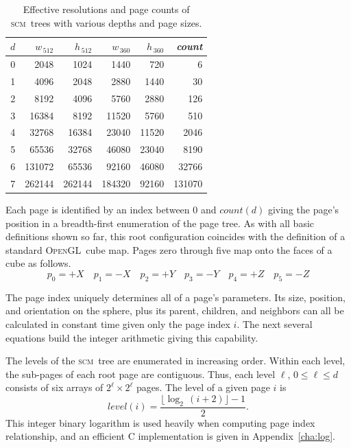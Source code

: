 \documentclass[oneside,10pt]{memoir}
\newcommand{\opengl}  {\textsc{OpenGL}}
\newcommand{\scm}     {\textsc{scm}}
\newcommand{\B}{\bigstrut[b]}
\newcommand{\T}{\bigstrut[t]}
\newcommand{\scmcount} [1]{\ensuremath{\mathit{count}(#1)}}
\newcommand{\scmlevel} [1]{\ensuremath{\mathit{level}(#1)}}
\begin{document}
\begin{Spacing}{1.1}
\begin{table}
  \centering
  \label{tab:resolution}
  \begin{tabular}{r|rr|rr|r}
  $d$& $w_{\,512}$& $h_{\,512}$& $w_{\,360}$& $h_{\,360}$& \textit{count} \B\\\hline
  \num{0}&  \num{2048}&  \num{1024}&  \num{1440}&  \num{720}&     \num{6} \T\\
  \num{1}&  \num{4096}&  \num{2048}&  \num{2880}& \num{1440}&    \num{30} \\
  \num{2}&  \num{8192}&  \num{4096}&  \num{5760}& \num{2880}&   \num{126} \\
  \num{3}& \num{16384}&  \num{8192}& \num{11520}& \num{5760}&   \num{510} \\
  \num{4}& \num{32768}& \num{16384}& \num{23040}&\num{11520}&  \num{2046} \\
  \num{5}& \num{65536}& \num{32768}& \num{46080}&\num{23040}&  \num{8190} \\
  \num{6}&\num{131072}& \num{65536}& \num{92160}&\num{46080}& \num{32766} \\
  \num{7}&\num{262144}&\num{262144}&\num{184320}&\num{92160}&\num{131070} \\
  \end{tabular}
  \caption{Effective resolutions and page counts of \scm\ trees with various depths and page sizes.}
\end{table}

Each page is identified by an index between $0$ and $\scmcount{d}$ giving the page's position in a breadth-first enumeration of the page tree. As with all basic definitions shown so far, this root configuration coincides with the definition of a standard \opengl\ cube map. Pages zero through five map onto the faces of a cube as follows.
\[p_0=+X\quad p_1=-X\quad p_2=+Y\quad p_3=-Y\quad p_4=+Z\quad p_5=-Z\]

The page index uniquely determines all of a page's parameters. Its size, position, and orientation on the sphere, plus its parent, children, and neighbors can all be calculated in constant time given only the page index $i$. The next several equations build the integer arithmetic giving this capability.

The levels of the \scm\ tree are enumerated in increasing order. Within each level, the sub-pages of each root page are contiguous. Thus, each level $\ell$, $0\leq\ell\leq d$ consists of six arrays of $2^\ell\times2^\ell$ pages. The level of a given page $i$ is
\[\scmlevel{i}=\frac{\lfloor\log_2\,(i+2)\rfloor-1}{2}.\]
This integer binary logarithm is used heavily when computing page index relationship, and an efficient C implementation is given in Appendix~\ref{cha:log}.


\end{Spacing}
\end{document}
